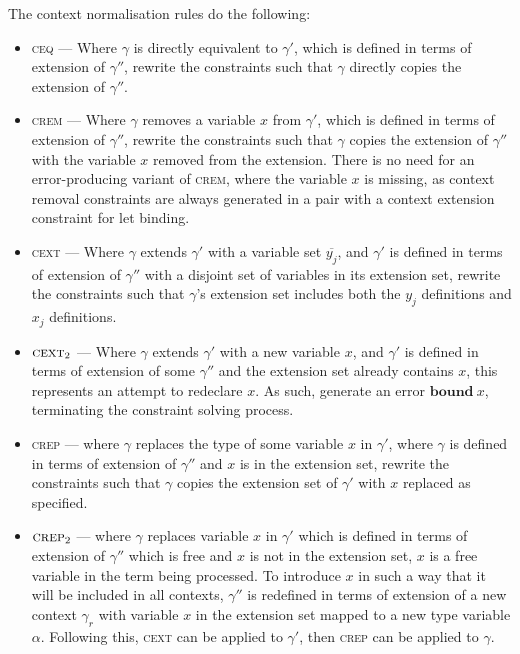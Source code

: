 \documentclass{article}
\begin{document}
The context normalisation rules do the following:

\begin{itemize}
\item \textsc{ceq} --- Where $\gamma$ is directly equivalent
to $\gamma'$, which is defined in terms of extension of
$\gamma''$, rewrite the constraints such that
$\gamma$ directly copies the extension of $\gamma''$.
\item \textsc{crem} --- Where $\gamma$ removes a variable $x$ from $\gamma'$,
which is defined in terms of extension of $\gamma''$, rewrite the
constraints such that $\gamma$ copies the extension of $\gamma''$ with
the variable $x$ removed from the extension. There is no need for an
error-producing variant of \textsc{crem}, where the variable $x$ is missing, 
as context removal constraints are always generated in a pair with a context 
extension constraint for let binding.
\item \textsc{cext} --- Where $\gamma$ extends $\gamma'$ with
a variable set $\overline{y_j}$, and $\gamma'$ is defined in terms of extension of
$\gamma''$ with a disjoint set of variables in its extension set, rewrite the
constraints such that $\gamma$'s extension set includes both the $y_j$
definitions and $x_j$ definitions.
\item $\textsc{cext}_2$ --- Where $\gamma$ extends $\gamma'$ with
a new variable $x$, and $\gamma'$ is defined in terms of extension of
some $\gamma''$ and the extension set already contains $x$, this
represents an attempt to redeclare $x$. As such, generate an error
$\mathbf{bound}\:x$, terminating the constraint solving process.
\item \textsc{crep} --- where $\gamma$ replaces the type of some
variable $x$ in $\gamma'$, where $\gamma$ is defined in terms of extension
of $\gamma''$ and $x$ is in the extension set, rewrite the constraints
such that $\gamma$ copies the extension set of $\gamma'$ with $x$
replaced as specified.
\item $\textsc{crep}_2$ --- where $\gamma$ replaces variable $x$ in
$\gamma'$ which is defined in terms of extension of $\gamma''$
which is free and $x$ is not in the extension set, $x$ is a
free variable in the term being processed. To introduce $x$ in such a way that
it will be included in all contexts, $\gamma''$ is redefined in
terms of extension of a new context $\gamma_r$ with variable $x$
in the extension set mapped to a new type variable $\alpha$. Following
this, \textsc{cext} can be applied to $\gamma'$, then \textsc{crep} can
be applied to $\gamma$.

\end{itemize}
\end{document}
